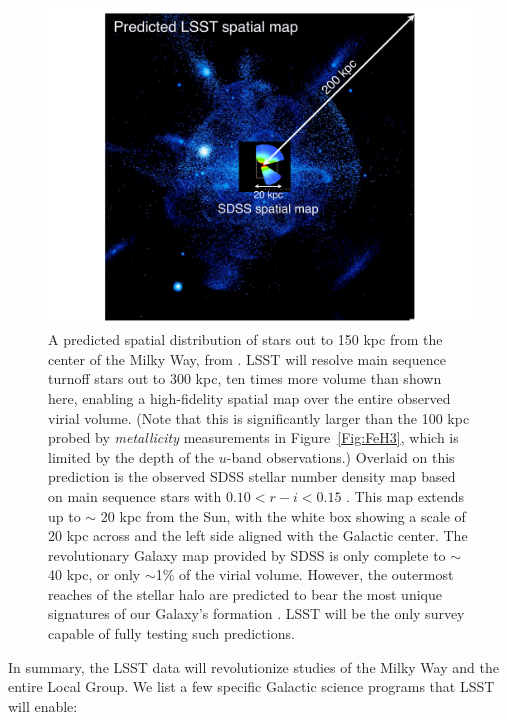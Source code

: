 \begin{figure}
\includegraphics[width=1.\hsize,clip]{BethMWhalo}
\caption{A predicted spatial distribution of stars out to 150 kpc from the center of the Milky Way,
from \citet{2005ApJ...635..931B}.  LSST will resolve main sequence turnoff stars out to 300 kpc, ten times
more volume than shown here, enabling a high-fidelity spatial map over
the entire observed virial volume. (Note that this is significantly larger than the
100 kpc probed by {\em metallicity} measurements in
Figure~\ref{Fig:FeH3}, which is limited by the depth of the $u$-band observations.)
Overlaid on this prediction is the observed SDSS stellar number density map based on main sequence stars
with $0.10 < r-i < 0.15$ \citep{2008ApJ...673..864J}.  This map extends up to $\sim$ 20 kpc from the Sun, with
the white box showing a scale of 20 kpc across and the left side aligned with the Galactic center.
The revolutionary Galaxy map provided by SDSS is only complete to $\sim$40 kpc, or only $\sim$1\% of
the virial volume.  However, the outermost reaches of the stellar halo are predicted to bear the most unique
signatures of our Galaxy's formation \citep{2008ApJ...689..936J,2010MNRAS.406..744C}.   LSST will be the only survey
capable of fully testing such predictions.}
\label{Fig:halo}
\end{figure}



In summary, the LSST data will revolutionize studies of the Milky Way and the entire Local Group. We list a few specific
Galactic science programs that LSST will enable:

